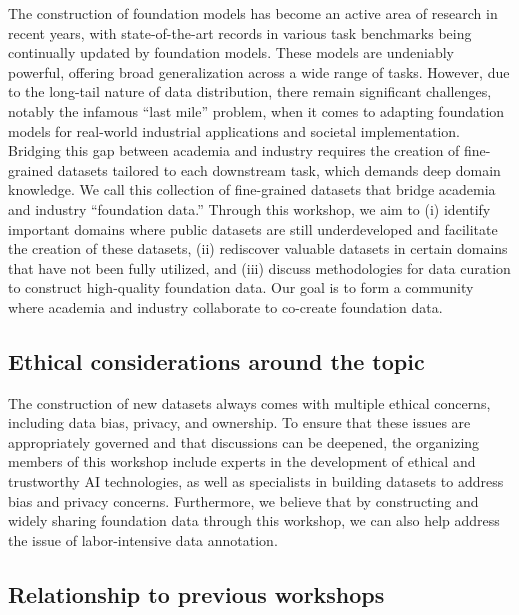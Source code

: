 \documentclass{article}
\begin{document}
The construction of foundation models has become an active area of research in recent years, with state-of-the-art records in various task benchmarks being continually updated by foundation models. These models are undeniably powerful, offering broad generalization across a wide range of tasks. However, due to the long-tail nature of data distribution, there remain significant challenges, notably the infamous ``last mile'' problem, when it comes to adapting foundation models for real-world industrial applications and societal implementation. Bridging this gap between academia and industry requires the creation of fine-grained datasets tailored to each downstream task, which demands deep domain knowledge. We call this collection of fine-grained datasets that bridge academia and industry ``foundation data.'' Through this workshop, we aim to (i) identify important domains where public datasets are still underdeveloped and facilitate the creation of these datasets, (ii) rediscover valuable datasets in certain domains that have not been fully utilized, and (iii) discuss methodologies for data curation to construct high-quality foundation data. Our goal is to form a community where academia and industry collaborate to co-create foundation data.

\subsection{Ethical considerations around the topic}

The construction of new datasets always comes with multiple ethical concerns, including data bias, privacy, and ownership. To ensure that these issues are appropriately governed and that discussions can be deepened, the organizing members of this workshop include experts in the development of ethical and trustworthy AI technologies, as well as specialists in building datasets to address bias and privacy concerns. Furthermore, we believe that by constructing and widely sharing foundation data through this workshop, we can also help address the issue of labor-intensive data annotation.

\subsection{Relationship to previous workshops}
\end{document}
